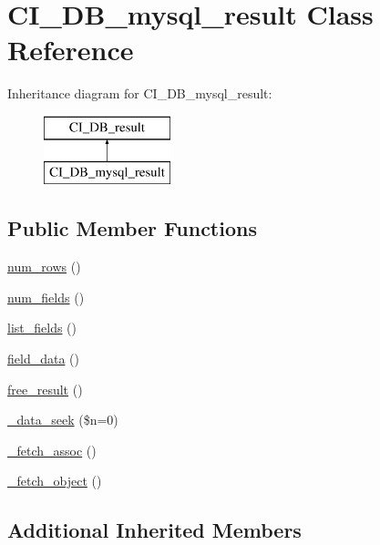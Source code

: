 \hypertarget{class_c_i___d_b__mysql__result}{\section{C\-I\-\_\-\-D\-B\-\_\-mysql\-\_\-result Class Reference}
\label{class_c_i___d_b__mysql__result}
}
Inheritance diagram for C\-I\-\_\-\-D\-B\-\_\-mysql\-\_\-result\-:\begin{figure}[H]
\begin{center}
\leavevmode
\includegraphics[height=2.000000cm]{class_c_i___d_b__mysql__result}
\end{center}
\end{figure}
\subsection*{Public Member Functions}
\begin{DoxyCompactItemize}
\item 
\hyperlink{class_c_i___d_b__mysql__result_a218657c303ee499b97710ab0cd2f5d6e}{num\-\_\-rows} ()
\item 
\hyperlink{class_c_i___d_b__mysql__result_af831bf363e4d7d661a717a4932af449d}{num\-\_\-fields} ()
\item 
\hyperlink{class_c_i___d_b__mysql__result_a50b54eb4ea7cfd039740f532988ea776}{list\-\_\-fields} ()
\item 
\hyperlink{class_c_i___d_b__mysql__result_a84bffd65e53902ade1591716749a33e3}{field\-\_\-data} ()
\item 
\hyperlink{class_c_i___d_b__mysql__result_aad2d98d6beb3d6095405356c6107b473}{free\-\_\-result} ()
\item 
\hyperlink{class_c_i___d_b__mysql__result_aeba9dd69307793342d1c81ccb3e55ff9}{\-\_\-data\-\_\-seek} (\$n=0)
\item 
\hyperlink{class_c_i___d_b__mysql__result_a43a9a92817f1334a1c10752ec44275a0}{\-\_\-fetch\-\_\-assoc} ()
\item 
\hyperlink{class_c_i___d_b__mysql__result_a236bae79bb43606aa86598719b281c1f}{\-\_\-fetch\-\_\-object} ()
\end{DoxyCompactItemize}
\subsection*{Additional Inherited Members}



